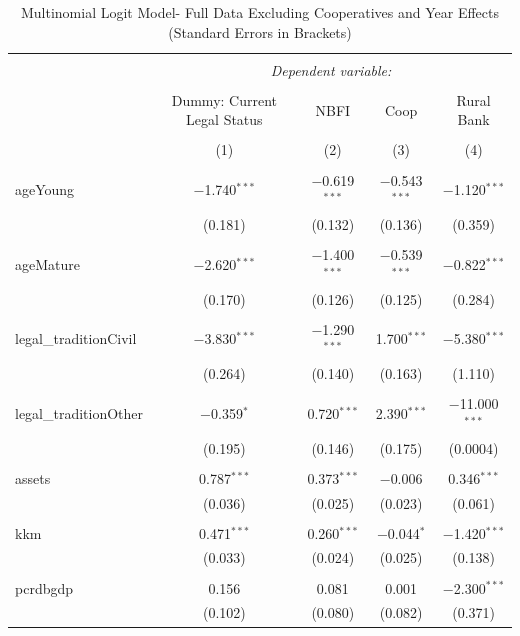 \documentclass[a4paper, nobind]{templates/ociamthesis}
\begin{document}
\begin{table}[!htbp] \centering 
  \caption{Multinomial Logit Model- Full Data Excluding Cooperatives and Year Effects (Standard Errors in Brackets)} 
  \label{} 
\footnotesize 
\begin{tabular}{@{\extracolsep{5pt}}lcccc} 
\\[-1.8ex]\hline 
\hline \\[-1.8ex] 
 & \multicolumn{4}{c}{\textit{Dependent variable:}} \\ 
\cline{2-5} 
\\[-1.8ex] & Dummy: Current Legal Status & NBFI & Coop & Rural Bank \\ 
\\[-1.8ex] & (1) & (2) & (3) & (4)\\ 
\hline \\[-1.8ex] 
 ageYoung & $-$1.740$^{***}$ & $-$0.619$^{***}$ & $-$0.543$^{***}$ & $-$1.120$^{***}$ \\ 
  & (0.181) & (0.132) & (0.136) & (0.359) \\ 
  & & & & \\ 
 ageMature & $-$2.620$^{***}$ & $-$1.400$^{***}$ & $-$0.539$^{***}$ & $-$0.822$^{***}$ \\ 
  & (0.170) & (0.126) & (0.125) & (0.284) \\ 
  & & & & \\ 
 legal\_traditionCivil & $-$3.830$^{***}$ & $-$1.290$^{***}$ & 1.700$^{***}$ & $-$5.380$^{***}$ \\ 
  & (0.264) & (0.140) & (0.163) & (1.110) \\ 
  & & & & \\ 
 legal\_traditionOther & $-$0.359$^{*}$ & 0.720$^{***}$ & 2.390$^{***}$ & $-$11.000$^{***}$ \\ 
  & (0.195) & (0.146) & (0.175) & (0.0004) \\ 
  & & & & \\ 
 assets & 0.787$^{***}$ & 0.373$^{***}$ & $-$0.006 & 0.346$^{***}$ \\ 
  & (0.036) & (0.025) & (0.023) & (0.061) \\ 
  & & & & \\ 
 kkm & 0.471$^{***}$ & 0.260$^{***}$ & $-$0.044$^{*}$ & $-$1.420$^{***}$ \\ 
  & (0.033) & (0.024) & (0.025) & (0.138) \\ 
  & & & & \\ 
 pcrdbgdp & 0.156 & 0.081 & 0.001 & $-$2.300$^{***}$ \\ 
  & (0.102) & (0.080) & (0.082) & (0.371) \\ 

\end{tabular}
\end{table}
\end{document}
